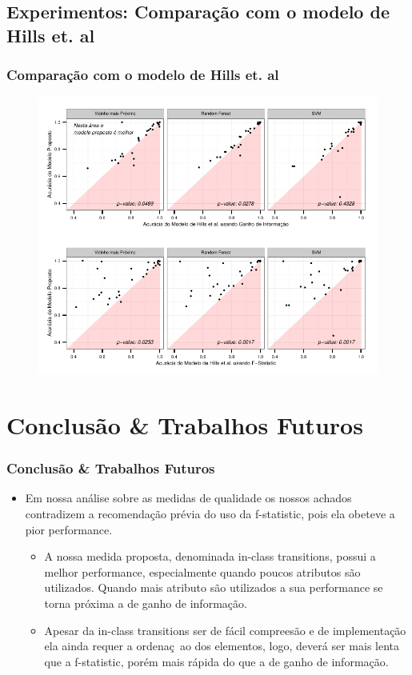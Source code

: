 \documentclass{beamer}
\begin{document}
\subsection{Experimentos: Compara{\c c}{\~a}o com o modelo de Hills et. al}
\begin{frame}
\frametitle{Compara{\c c}{\~a}o com o modelo de Hills et. al \cite{Hills:2013dk}}

\begin{figure}
\includegraphics[width=0.75\linewidth]{images/final-comparison.pdf}
\end{figure}
\end{frame}

\section{Conclus{\~a}o \& Trabalhos Futuros}

\begin{frame}
\frametitle{Conclus{\~a}o \& Trabalhos Futuros}
\begin{itemize}
\item Em nossa an{\'a}lise sobre as medidas de qualidade os nossos achados contradizem a recomenda{\c c}{\~a}o pr{\'e}via do uso da f-statistic, pois ela obeteve a pior performance. 

\begin{itemize}
\item A nossa medida proposta, denominada in-class transitions, possui a melhor performance, especialmente quando poucos atributos s{\~a}o utilizados. Quando mais atributo s{\~a}o utilizados a sua performance se torna pr{\'o}xima a de ganho de informa{\c c}{\~a}o. 

\item Apesar da in-class transitions ser de f{\'a}cil comprees{\~a}o e de implementa{\c c}{\~a}o ela ainda requer a ordena{\c c}{~a}o dos elementos, logo, dever{\'a} ser mais lenta que a f-statistic, por{\'e}m mais r{\'a}pida do que a de ganho de informa{\c c}{\~a}o.
\end{itemize}
\end{itemize}
\end{frame}
\end{document}
